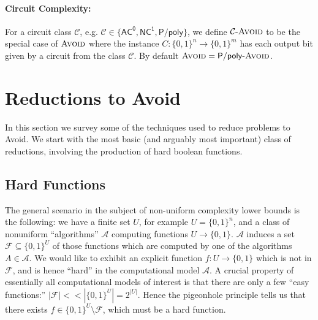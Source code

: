 \documentclass[11pt]{article}
\newcommand{\dash}{\text{-}}
\newcommand{\B}{\{0,1\}}
\newcommand{\ec}{\mathrm{EC}_\Pi}
\newcommand{\avoid}{\textsc{Avoid}}
\begin{document}
\paragraph{Circuit Complexity:} For a circuit class $\mathcal{C}$, e.g. $\mathcal{C} \in \{\mathsf{AC^0}, \mathsf{NC^1}, \mathsf{P/poly}\}$, we define $\mathcal{C}\dash\avoid$ to be the special case of $\avoid$ where the instance $C: \B^n \to \B^m$ has each output bit given by a circuit from the class $\mathcal{C}$. By default $\avoid = \mathsf{P/poly}\dash\avoid$.



\section{Reductions to Avoid}\label{sec:reductions}
In this section we survey some of the techniques used to reduce problems to Avoid. We start with the most basic (and arguably most important) class of reductions, involving the production of hard boolean functions.
\subsection{Hard Functions}\label{sec:hard-func-reductions}

The general scenario in the subject of non-uniform complexity lower bounds is the following: we have a finite set $U$, for example $U= \B^n$, and a class of nonuniform ``algorithms'' $\mathcal{A}$ computing functions $U \to \B$. $\mathcal{A}$ induces a set $\mathcal{F} \subseteq \B^U$ of those functions which are computed by one of the algorithms $A \in \mathcal{A}$. We would like to exhibit an explicit function $f: U \to \B$ which is not in $\mathcal{F}$, and is hence ``hard'' in the computational model $\mathcal{A}$. A crucial property of essentially all computational models of interest is that there are only a few ``easy functions:'' $|\mathcal{F}| << |\B^{U}| = 2^{|U|}$. Hence the pigeonhole principle tells us that there exists $f \in \B^U \setminus \mathcal{F}$, which must be a hard function.
\end{document}
